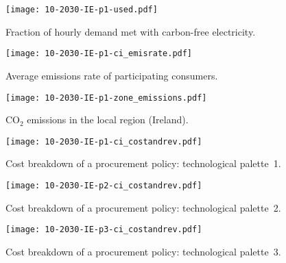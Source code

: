\documentclass[11pt, 5p, nopreprintline]{elsarticle}
\begin{document}
\begin{figure*}
    \centering
    \begin{subfigure}{0.5\textwidth}
        \centering
        \caption{Fraction of hourly demand met with carbon-free electricity.}
        \texttt{[image: 10-2030-IE-p1-used.pdf]}
        \label{fig:10-2030-IE-p1-used}
    \end{subfigure}%
    \begin{subfigure}{0.5\textwidth}
        \centering
        \caption{Average emissions rate of participating consumers.}
        \texttt{[image: 10-2030-IE-p1-ci\_emisrate.pdf]}
        \label{fig:10-2030-IE-p1-ci_emisrate}
    \end{subfigure}

    \begin{subfigure}{0.5\textwidth}
        \centering
        \caption{CO$_2$ emissions in the local region (Ireland).}
        \texttt{[image: 10-2030-IE-p1-zone\_emissions.pdf]}
        \label{fig:10-2030-IE-p1-zone_emissions}
    \end{subfigure}%
    \begin{subfigure}{0.5\textwidth}
        \caption{Cost breakdown of a procurement policy: technological palette~1.}
        \texttt{[image: 10-2030-IE-p1-ci\_costandrev.pdf]}
        \label{fig:10-2030-IE-p1-ci_costandrev}
    \end{subfigure}%

    \begin{subfigure}{0.5\textwidth}
        \centering
        \caption{Cost breakdown of a procurement policy: technological palette~2.}
        \texttt{[image: 10-2030-IE-p2-ci\_costandrev.pdf]}
        \label{fig:10-2030-IE-p2-ci_costandrev}
    \end{subfigure}%
    \begin{subfigure}{0.5\textwidth}
        \centering
        \caption{Cost breakdown of a procurement policy: technological palette~3.}
        \texttt{[image: 10-2030-IE-p3-ci\_costandrev.pdf]}
        \label{fig:10-2030-IE-p3-ci_costandrev}
    \end{subfigure}

    \caption{Results for the scenario of Ireland 2030; 10\% participation rate.
    Figures \ref{fig:10-2030-IE-p1-used}--\ref{fig:10-2030-IE-p1-ci_costandrev} display the technological palette~1 scenario.}
    \label{fig:10-2030-IE-6plots}
\end{figure*}
\end{document}
